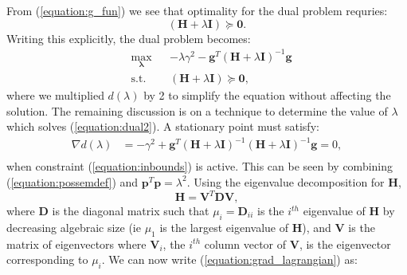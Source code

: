 \documentclass[letterpaper,12pt,titlepage,oneside,final]{book}
\begin{document}
	 From (\ref{equation:g_fun}) we see that optimality for the dual problem requries:
	\begin{equation}
	(\mathbf{H} + \lambda\mathbf{I}) \succeq \mathbf{0}.
	\label{equation:possemdef}
	\end{equation}
	Writing this explicitly, the dual problem becomes:
	\begin{equation}
	\begin{aligned}
	& \underset{\mathbf{\lambda}}{\text{max}}
	& & -\lambda\gamma^{2} - \mathbf{g}^{T}(\mathbf{H} + \lambda\mathbf{I})^{-1}\mathbf{g} \\
	& \text{s.t.}
	& & (\mathbf{H} + \lambda\mathbf{I}) \succeq \mathbf{0},
	\label{equation:dual2}
	\end{aligned}
	\end{equation}
	where we multiplied $d(\lambda)$ by 2 to simplify the equation without affecting the solution. The remaining discussion is on a technique to determine the value of $\lambda$ which solves (\ref{equation:dual2}). A stationary point must satisfy:
	\begin{equation}
	\begin{aligned}
	\nabla d(\lambda) & = -\gamma^{2} + \mathbf{g}^{T}(\mathbf{H} + \lambda\mathbf{I})^{-1}(\mathbf{H} + \lambda\mathbf{I})^{-1}\mathbf{g} = 0, \\
	\end{aligned}
	\label{equation:grad_lagrangian}
	\end{equation}
	when constraint (\ref{equation:inbounds}) is active. This can be seen by combining (\ref{equation:possemdef}) and $\mathbf{p}^{T}\mathbf{p} = \lambda^{2}$. Using the eigenvalue decomposition for $\mathbf{H}$,
	\begin{equation}
	\mathbf{H} = \mathbf{V}^{T}\mathbf{D}\mathbf{V},
	\end{equation}
	where $\mathbf{D}$ is the diagonal matrix such that $\mu_{i} = \mathbf{D}_{ii}$ is the $i^{th}$ eigenvalue of $\mathbf{H}$ by decreasing algebraic size (ie $\mu_{1}$ is the largest eigenvalue of $\mathbf{H}$), and $\mathbf{V}$ is the matrix of eigenvectors where $\mathbf{V}_{i}$, the $i^{th}$ column vector of \textbf{V}, is the eigenvector corresponding to $\mu_{i}$. We can now write (\ref{equation:grad_lagrangian}) as:
\end{document}
